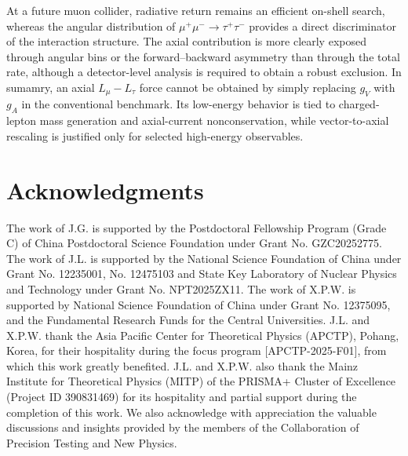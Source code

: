 \documentclass[onecolumn, aps, nofootinbib, prd, preprint, floats, floatfix, amsmath, amssymb, superscriptaddress, preprintnumbers]{revtex4-2}
\begin{document}
At a future muon collider, radiative return remains an efficient on-shell search, whereas the angular distribution of $\mu^+\mu^-\to\tau^+\tau^-$ provides a direct discriminator of the interaction structure. The axial contribution is more clearly exposed through angular bins or the forward--backward asymmetry than through the total rate, although a detector-level analysis is required to obtain a robust exclusion. In sumamry, an axial $L_\mu-L_\tau$ force cannot be obtained by simply replacing $g_V$ with $g_A$ in the conventional benchmark. Its low-energy behavior is tied to charged-lepton mass generation and axial-current nonconservation, while vector-to-axial rescaling is justified only for selected high-energy observables.



\section{Acknowledgments}
The work of J.G. is supported by the Postdoctoral Fellowship Program (Grade C) of China Postdoctoral Science Foundation under Grant No. GZC20252775.
The work of J.L. is supported by the National Science Foundation of China under Grant No. 12235001, No. 12475103
and State Key Laboratory of Nuclear Physics and Technology under Grant No. NPT2025ZX11. 
The work of X.P.W. is supported by National Science Foundation of China under Grant No. 12375095, and the Fundamental Research Funds for the Central Universities.
J.L. and X.P.W. thank the Asia Pacific Center for Theoretical Physics (APCTP), Pohang, Korea, for their hospitality during the focus program [APCTP-2025-F01], from which this work greatly benefited. J.L. and X.P.W. also thank the Mainz Institute for Theoretical Physics (MITP) of the PRISMA+ Cluster of Excellence (Project ID 390831469) for its hospitality and partial support during the completion of this work. We also acknowledge with appreciation the valuable discussions and insights provided by the members of the Collaboration of Precision Testing and New Physics.



\end{document}
